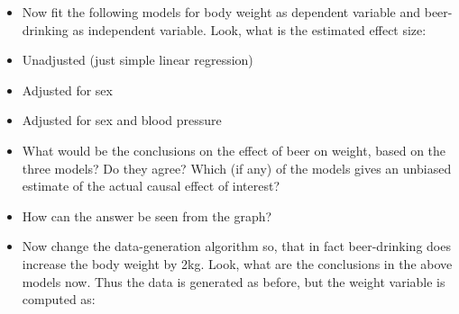 \documentclass[
]{book}
\newenvironment{Shaded}{\begin{snugshade}}{\end{snugshade}}
\newcommand{\AttributeTok}[1]{\textcolor[rgb]{0.13,0.29,0.53}{#1}}
\newcommand{\CommentTok}[1]{\textcolor[rgb]{0.56,0.35,0.01}{\textit{#1}}}
\newcommand{\DecValTok}[1]{\textcolor[rgb]{0.00,0.00,0.81}{#1}}
\newcommand{\FloatTok}[1]{\textcolor[rgb]{0.00,0.00,0.81}{#1}}
\newcommand{\FunctionTok}[1]{\textcolor[rgb]{0.13,0.29,0.53}{\textbf{#1}}}
\newcommand{\NormalTok}[1]{#1}
\newcommand{\OtherTok}[1]{\textcolor[rgb]{0.56,0.35,0.01}{#1}}
\newcommand{\SpecialCharTok}[1]{\textcolor[rgb]{0.81,0.36,0.00}{\textbf{#1}}}
\begin{document}
\begin{Shaded}
\end{Shaded}

\begin{itemize}
\item
  Now fit the following models for body weight as dependent
  variable and beer-drinking as independent variable. Look, what is
  the estimated effect size:
\item
  Unadjusted (just simple linear regression)
\item
  Adjusted for sex
\item
  Adjusted for sex and blood pressure
\item
  What would be the conclusions on the effect of beer on weight, based on the three models? Do they agree?
  Which (if any) of the models gives an unbiased estimate of the
  actual causal effect of interest?
\item
  How can the answer be seen from the graph?
\item
  Now change the data-generation algorithm so, that in fact beer-drinking
  does increase the body weight by 2kg. Look, what are
  the conclusions in the above models now.
  Thus the data is generated as before, but the weight variable is computed as:
\end{itemize}
\end{document}
